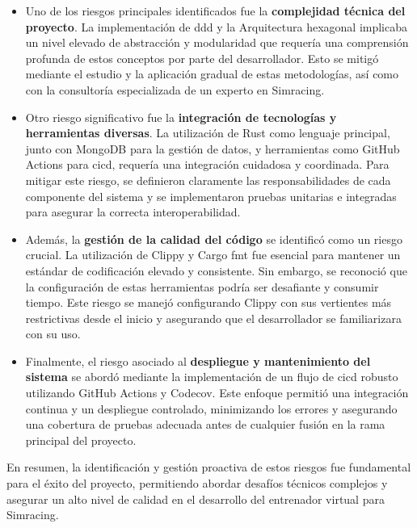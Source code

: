 \begin{itemize}
    \item Uno de los riesgos principales identificados fue la \textbf{complejidad técnica del proyecto}. La implementación de \ac{ddd} y la Arquitectura hexagonal implicaba un nivel elevado de abstracción y modularidad que requería una comprensión profunda de estos conceptos por parte del desarrollador. Esto se mitigó mediante el estudio y la aplicación gradual de estas metodologías, así como con la consultoría especializada de un experto en Simracing.
    \item Otro riesgo significativo fue la \textbf{integración de tecnologías y herramientas diversas}. La utilización de Rust como lenguaje principal, junto con MongoDB para la gestión de datos, y herramientas como GitHub Actions para \ac{cicd}, requería una integración cuidadosa y coordinada. Para mitigar este riesgo, se definieron claramente las responsabilidades de cada componente del sistema y se implementaron pruebas unitarias e integradas para asegurar la correcta interoperabilidad.
    \item Además, la \textbf{gestión de la calidad del código} se identificó como un riesgo crucial. La utilización de Clippy y Cargo fmt fue esencial para mantener un estándar de codificación elevado y consistente. Sin embargo, se reconoció que la configuración de estas herramientas podría ser desafiante y consumir tiempo. Este riesgo se manejó configurando Clippy con sus vertientes más restrictivas desde el inicio y asegurando que el desarrollador se familiarizara con su uso.
    \item Finalmente, el riesgo asociado al \textbf{despliegue y mantenimiento del sistema} se abordó mediante la implementación de un flujo de \ac{cicd} robusto utilizando GitHub Actions y Codecov. Este enfoque permitió una integración continua y un despliegue controlado, minimizando los errores y asegurando una cobertura de pruebas adecuada antes de cualquier fusión en la rama principal del proyecto.
\end{itemize}

En resumen, la identificación y gestión proactiva de estos riesgos fue fundamental para el éxito del proyecto, permitiendo abordar desafíos técnicos complejos y asegurar un alto nivel de calidad en el desarrollo del entrenador virtual para Simracing.